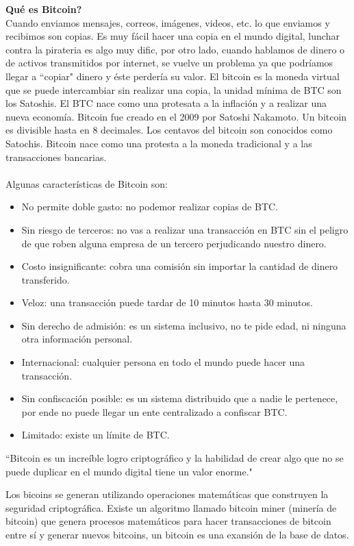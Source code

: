 \documentclass[a4paper,12pt]{/home/armando/Documentos/Cursos/LaTeX/Plantillas/lib/pub}
\begin{document}
\textbf{Qué es Bitcoin?}\\
Cuando enviamos mensajes, correos, imágenes, videos, etc. lo que enviamos y recibimos son copias. Es muy fácil hacer una copia en el mundo digital, lunchar contra la pirateria es algo muy dific, por otro lado, cuando hablamos de dinero o de activos transmitidos por internet, se vuelve un problema ya que podríamos llegar a ``copiar" dinero y éste perdería su valor.
El bitcoin es la moneda virtual que se puede intercambiar sin realizar una copia, la unidad mínima de BTC son los Satoshis. El BTC nace como una protesata a la inflación y a realizar una nueva economía.
Bitcoin fue creado en el 2009 por Satoshi Nakamoto. Un bitcoin es divisible hasta en 8 decimales. Los centavos del bitcoin son conocidos como Satochis. Bitcoin nace como una protesta a la moneda tradicional y a las transacciones bancarias.\\\\
Algunas características de Bitcoin son:
\begin{itemize}
\item No permite doble gasto: no podemor realizar copias de BTC.
\item Sin riesgo de terceros: no vas a realizar una transacción en BTC sin el peligro de que roben alguna empresa de un tercero perjudicando nuestro dinero.
\item Costo insignificante: cobra una comisión sin importar la cantidad de dinero transferido.
\item Veloz: una transacción puede tardar de 10 minutos hasta 30 minutos.
\item Sin derecho de admisión: es un sistema inclusivo, no te pide edad, ni ninguna otra información personal.
\item Internacional: cualquier persona en todo el mundo puede hacer una transacción.
\item Sin confiscación posible: es un sistema distribuido que a nadie le pertenece, por ende no puede llegar un ente centralizado a confiscar BTC.
\item Limitado: existe un límite de BTC.
\end{itemize}
``Bitcoin es un increíble logro criptográfico y la habilidad de crear algo que no se puede duplicar en el mundo digital tiene un valor enorme."

Los bicoins se generan utilizando operaciones matemáticas que construyen la seguridad criptográfica. Existe un algoritmo llamado bitcoin miner (minería de bitcoin) que genera procesos matemáticos para hacer transacciones de bitcoin entre sí y generar nuevos bitcoins, un bitcoin es una exansión de la base de datos.
\end{document}
